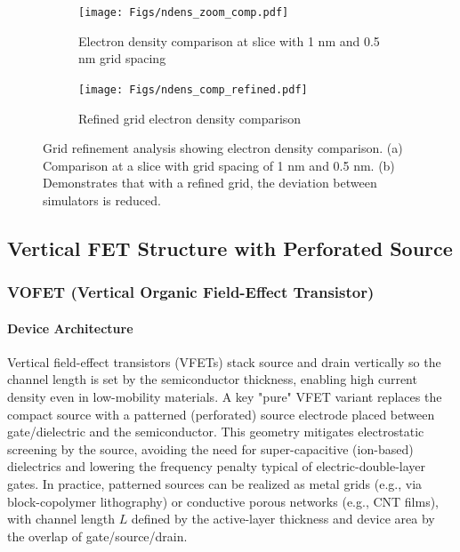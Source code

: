 \documentclass{article}
\begin{document}
\begin{figure}[H]
    \centering
    \begin{subfigure}[b]{0.48\textwidth}
        \centering
        \texttt{[image: Figs/ndens\_zoom\_comp.pdf]}
        \caption{Electron density comparison at slice with 1 nm and 0.5 nm grid spacing}
        \label{fig:ndens_zoom}
    \end{subfigure}
    \hfill
    \begin{subfigure}[b]{0.48\textwidth}
        \centering
        \texttt{[image: Figs/ndens\_comp\_refined.pdf]}
        \caption{Refined grid electron density comparison}
        \label{fig:ndens_refined}
    \end{subfigure}
    \caption{Grid refinement analysis showing electron density comparison. (a) Comparison at a slice with grid spacing of 1 nm and 0.5 nm. (b) Demonstrates that with a refined grid, the deviation between simulators is reduced.}
    \label{fig:refined_comparison}
\end{figure}

\subsection{Vertical FET Structure with Perforated Source}

\subsubsection{VOFET (Vertical Organic Field-Effect Transistor)}

\paragraph{Device Architecture}
Vertical field-effect transistors (VFETs) stack source and drain vertically so the channel length is set by the semiconductor thickness, enabling high current density even in low-mobility materials. A key "pure" VFET variant replaces the compact source with a patterned (perforated) source electrode placed between gate/dielectric and the semiconductor. This geometry mitigates electrostatic screening by the source, avoiding the need for super-capacitive (ion-based) dielectrics and lowering the frequency penalty typical of electric-double-layer gates. In practice, patterned sources can be realized as metal grids (e.g., via block-copolymer lithography) or conductive porous networks (e.g., CNT films), with channel length $L$ defined by the active-layer thickness and device area by the overlap of gate/source/drain.
\end{document}
